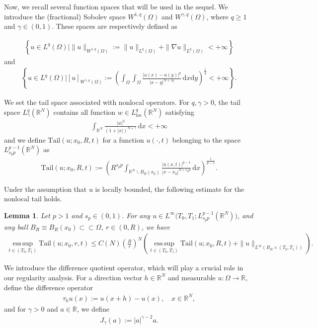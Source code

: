 \documentclass[reqno,10pt]{amsart}
\numberwithin{equation}{section}
\newtheorem{lemma}[theorem]{Lemma}
\begin{document}
Now, we recall several function spaces that will be used in the sequel. We introduce the (fractional) Sobolev space $W^{1, q}(\Omega)$ and $W^{\gamma, q}(\Omega)$, where $q\ge1$ and $\gamma\in(0, 1)$. These spaces are respectively defined as

\begin{align*}
	\left\lbrace u\in L^q(\Omega)\bigg|\|u\|_{W^{1,q}(\Omega)}:=\|u\|_{L^q(\Omega)}+\|\nabla u\|_{L^q(\Omega)}<+\infty\right\rbrace 
\end{align*}
and
\begin{align*}
	\left\lbrace u\in L^q(\Omega)\bigg|[u]_{W^{\gamma,q}(\Omega)}:=\left( \int_{\Omega}\int_{\Omega}\frac{|u(x)-u(y)|^q}{|x-y|^{N+\gamma q}}\,\mathrm{d}x\mathrm{d}y\right)^\frac{1}{q} <+\infty\right\rbrace .
\end{align*}

We set the tail space associated with nonlocal operators. For $q,\gamma>0$, the tail space $L^q_\gamma(\mathbb{R}^N)$ contains all function $w\in L^q_\mathrm{loc}(\mathbb{R}^N)$ satisfying
\begin{align*}
	\int_{\mathbb{R}^N}\frac{|w|^q}{(1+|x|)^{N+\gamma}}\,\mathrm{d}x<+\infty
\end{align*}
and we define $\mathrm{Tail}(u;x_0,R,t)$ for a function $u(\cdot,t)$ belonging to the space $L^{p-1}_{s_pp}(\mathbb{R}^N)$ as
\begin{align*}
	\mathrm{Tail}(u;x_0,R,t):=\left( R^{s_pp}\int_{\mathbb{R}^N\backslash B_R(x_0)}\frac{|u(x,t)|^{p-1}}{|x-x_0|^{N+s_p p}}\,\mathrm{d}x\right)^\frac{1}{p-1}. 
\end{align*}

Under the assumption that $u$ is locally bounded, the following estimate for the nonlocal tail holds.

\begin{lemma}
	\label{lem8}
	Let $p>1$ and $s_p\in (0, 1)$. For any $u\in L^\infty\bigl(T_0,T_1; L^{p-1}_{s_pp}(\mathbb{R}^N)\bigl) $, and any ball $B_R\equiv B_R(x_0)\subset\subset\Omega$, $r\in (0,R)$, we have
	\begin{align*}
		\operatorname*{ess\,sup}_{t\in(T_0,T_1)}\mathrm{Tail}(u;x_0,r,t)\le C(N)\left( \frac{R}{r}\right)^N\left(\operatorname*{ess\,sup}_{t\in(T_0,T_1)} \mathrm{Tail}(u;x_0,R,t)+\|u\|_{L^\infty(B_R\times(T_0,T_1))}\right).
	\end{align*}
\end{lemma}

We introduce the difference quotient operator, which will play a crucial role in our regularity analysis. For a direction vector $h\in \mathbb R^N$ and measurable $u: \Omega\to \mathbb R$, define the difference operator 
\begin{align*}
	\tau_hu(x):=u(x+h)-u(x), \quad x\in\mathbb{R}^N,
\end{align*}
and for $\gamma>0$ and $a\in\mathbb{R}$, we define
\begin{align*}
	J_\gamma(a):=|a|^{\gamma-2}a.
\end{align*}
\end{document}

